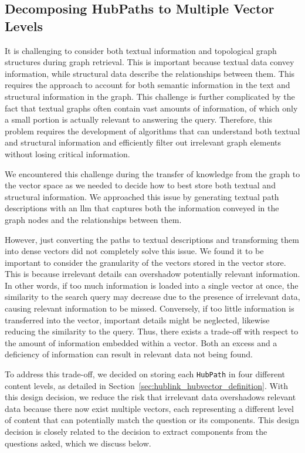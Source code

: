 \subsection{Decomposing HubPaths to Multiple Vector Levels}

It is challenging to consider both textual information and topological graph structures during graph retrieval. This is important because textual data convey information, while structural data describe the relationships between them. This requires the approach to account for both semantic information in the text and structural information in the graph. This challenge is further complicated by the fact that textual graphs often contain vast amounts of information, of which only a small portion is actually relevant to answering the query. Therefore, this problem requires the development of algorithms that can understand both textual and structural information and efficiently filter out irrelevant graph elements without losing critical information. \cite{peng_graph_2024,hu_grag_2024}

We encountered this challenge during the transfer of knowledge from the graph to the vector space as we needed to decide how to best store both textual and structural information. We approached this issue by generating textual path descriptions with an \gls{llm} that captures both the information conveyed in the graph nodes and the relationships between them.

However, just converting the paths to textual descriptions and transforming them into dense vectors did not completely solve this issue. We found it to be important to consider the granularity of the vectors stored in the vector store. This is because irrelevant details can overshadow potentially relevant information. In other words, if too much information is loaded into a single vector at once, the similarity to the search query may decrease due to the presence of irrelevant data, causing relevant information to be missed. Conversely, if too little information is transferred into the vector, important details might be neglected, likewise reducing the similarity to the query. Thus, there exists a trade-off with respect to the amount of information embedded within a vector. Both an excess and a deficiency of information can result in relevant data not being found.

To address this trade-off, we decided on storing each \texttt{HubPath} in four different content levels, as detailed in Section~\ref{sec:hublink_hubvector_definition}. With this design decision, we reduce the risk that irrelevant data overshadows relevant data because there now exist multiple vectors, each representing a different level of content that can potentially match the question or its components. This design decision is closely related to the decision to extract components from the questions asked, which we discuss below. 

